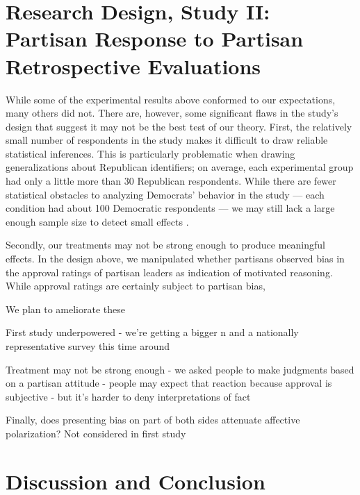 \documentclass[12pt, letterpaper]{article}
\begin{document}
\section*{Research Design, Study II: Partisan Response to Partisan Retrospective Evaluations}

While some of the experimental results above conformed to our expectations, many others did not. There are, however, some significant flaws in the study's design that suggest it may not be the best test of our theory. First, the relatively small number of respondents in the study makes it difficult to draw reliable statistical inferences. This is particularly problematic when drawing generalizations about Republican identifiers; on average, each experimental group had only a little more than 30 Republican respondents. While there are fewer statistical obstacles to analyzing Democrats' behavior in the study --- each condition had about 100 Democratic respondents --- we may still lack a large enough sample size to detect small effects \citep[e.g.,][]{cohen_1992}. 

Secondly, our treatments may not be strong enough to produce meaningful effects. In the design above, we manipulated whether partisans observed bias in the approval ratings of partisan leaders as indication of motivated reasoning. While approval ratings are certainly subject to partisan bias, 

We plan to ameliorate these 


First study underpowered - we're getting a bigger n and a nationally representative survey this time around 

Treatment may not be strong enough - we asked people to make judgments based on a partisan attitude - people may expect that reaction because approval is subjective - but it's harder to deny interpretations of fact

Finally, does presenting bias on part of both sides attenuate affective polarization? Not considered in first study


\section*{Discussion and Conclusion}

\clearpage




\clearpage

\appendix
\renewcommand{\thesection}{A \arabic{section}}
\renewcommand\thetable{\thesection.\arabic{table}}  
\renewcommand\thefigure{\thesection.\arabic{figure}}
\end{document}
